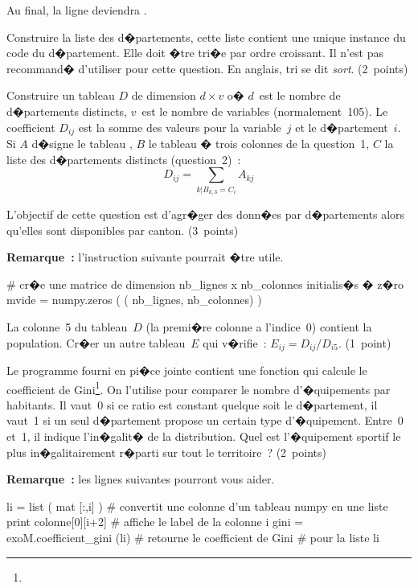 Au final, la ligne \codes{['01008', 'Ambutrix']} deviendra \codes{['01008', 'Ambutrix', '01']}.



\exequest Construire la liste des d�partements, cette liste contient une unique instance du code du d�partement. Elle doit �tre tri�e par ordre croissant. Il n'est pas recommand� d'utiliser  pour cette question. En anglais, tri se dit \textit{sort}. (2~points)

\exequest Construire un tableau $D$ de dimension $d \times v$ o� $d$~est le nombre de d�partements distincts, $v$~est le nombre de variables (normalement~105). Le coefficient $D_{ij}$ est la somme des valeurs pour la variable~$j$ et le d�partement~$i$. Si $A$ d�signe le tableau , $B$ le tableau � trois colonnes de la question~1, $C$ la liste des d�partements distincts (question~2)~:
$$
D_{ij} = \sum_{k | B_{k,3} = C_i} A_{kj}
$$


L'objectif de cette question est d'agr�ger des donn�es par d�partements alors qu'elles sont disponibles par canton. (3~points)

\textbf{Remarque~:} l'instruction suivante pourrait �tre utile.

\begin{verbatimx}
# cr�e une matrice de dimension nb_lignes x nb_colonnes initialis�s � z�ro
mvide = numpy.zeros ( ( nb_lignes, nb_colonnes) )
\end{verbatimx}



\exequest La colonne~5 du tableau~$D$ (la premi�re colonne a l'indice~0) contient la population. Cr�er un autre tableau~$E$ qui v�rifie~: $E_{ij} = D_{ij} / D_{i5}$. (1~point)

\exequest Le programme fourni en pi�ce jointe contient une fonction  qui calcule le coefficient de Gini\footnote{}. On l'utilise pour comparer le nombre d'�quipements par habitants. Il vaut~0 si ce ratio est constant quelque soit le d�partement, il vaut~1 si un seul d�partement propose un certain type d'�quipement. Entre~0 et~1, il indique l'in�galit� de la distribution. Quel est l'�quipement sportif le plus in�galitairement r�parti sur tout le territoire~? (2~points)

\textbf{Remarque~:} les lignes suivantes pourront vous aider.

\begin{verbatimx}
li = list ( mat [:,i] )           # convertit une colonne d'un tableau numpy en une liste
print colonne[0][i+2]             # affiche le label de la colonne i
gini = exoM.coefficient_gini (li) # retourne le coefficient de Gini
                                  # pour la liste li
\end{verbatimx}


